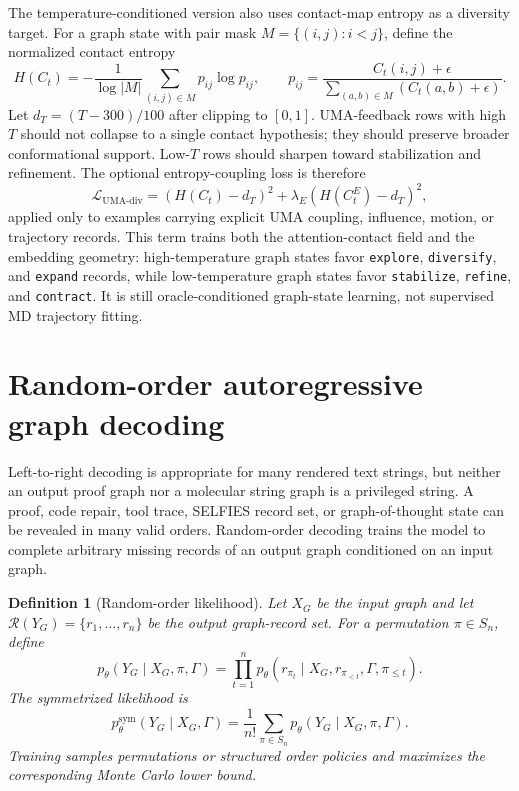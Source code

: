 \documentclass[11pt]{article}
\newtheorem{definition}{Definition}[section]
\newcommand{\1}{\mathbf{1}}
\begin{document}
The temperature-conditioned version also uses contact-map entropy as a diversity target. For a graph state with pair mask \(M=\{(i,j):i<j\}\), define the normalized contact entropy
\[
  H(C_t)=-\frac{1}{\log |M|}
  \sum_{(i,j)\in M}p_{ij}\log p_{ij},
  \qquad
  p_{ij}=\frac{C_t(i,j)+\epsilon}{\sum_{(a,b)\in M}(C_t(a,b)+\epsilon)} .
\]
Let \(d_T=(T-300)/100\) after clipping to \([0,1]\). UMA-feedback rows with high \(T\) should not collapse to a single contact hypothesis; they should preserve broader conformational support. Low-\(T\) rows should sharpen toward stabilization and refinement. The optional entropy-coupling loss is therefore
\[
  \mathcal L_{\mathrm{UMA\mbox{-}div}}=
  \left(H(C_t)-d_T\right)^2+
  \lambda_E\left(H(C_t^E)-d_T\right)^2,
\]
applied only to examples carrying explicit UMA coupling, influence, motion, or trajectory records. This term trains both the attention-contact field and the embedding geometry: high-temperature graph states favor \texttt{explore}, \texttt{diversify}, and \texttt{expand} records, while low-temperature graph states favor \texttt{stabilize}, \texttt{refine}, and \texttt{contract}. It is still oracle-conditioned graph-state learning, not supervised MD trajectory fitting.

\section{Random-order autoregressive graph decoding}

Left-to-right decoding is appropriate for many rendered text strings, but neither an output proof graph nor a molecular string graph is a privileged string. A proof, code repair, tool trace, SELFIES record set, or graph-of-thought state can be revealed in many valid orders. Random-order decoding trains the model to complete arbitrary missing records of an output graph conditioned on an input graph.

\begin{definition}[Random-order likelihood]
Let $X_G$ be the input graph and let $\mathcal R(Y_G)=\{r_1,\ldots,r_n\}$ be the output graph-record set. For a permutation $\pi\in S_n$, define
\[
  p_\theta(Y_G\mid X_G,\pi,\Gamma)=\prod_{t=1}^n p_\theta(r_{\pi_t}\mid X_G,r_{\pi_{<t}},\Gamma,\pi_{\le t}).
\]
The symmetrized likelihood is
\[
  p_\theta^{\mathrm{sym}}(Y_G\mid X_G,\Gamma)=\frac{1}{n!}\sum_{\pi\in S_n}p_\theta(Y_G\mid X_G,\pi,\Gamma).
\]
Training samples permutations or structured order policies and maximizes the corresponding Monte Carlo lower bound.
\end{definition}
\end{document}
